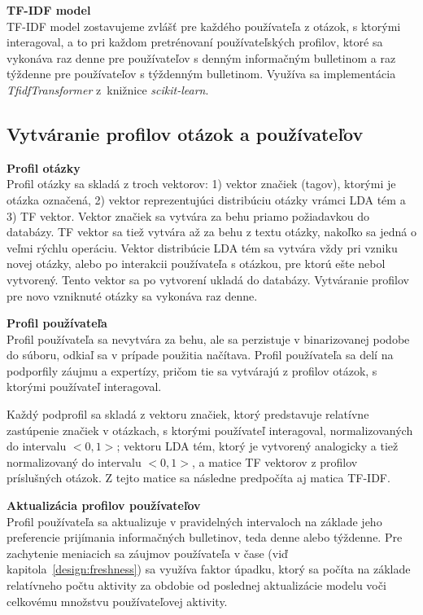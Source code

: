 \textbf{TF-IDF model}\\
TF-IDF model zostavujeme zvlášť pre každého používateľa z otázok, s ktorými interagoval, a to pri každom pretrénovaní používateľských
profilov, ktoré sa vykonáva raz denne pre používateľov s denným informačným bulletinom a raz týždenne pre používateľov s týždenným
bulletinom. Využíva sa implementácia \textit{TfidfTransformer} z~knižnice \textit{scikit-learn}.


\subsection{Vytváranie profilov otázok a používateľov}

\textbf{Profil otázky}\\
Profil otázky sa skladá z troch vektorov: 1) vektor značiek (tagov), ktorými je otázka označená, 2) vektor reprezentujúci
distribúciu otázky vrámci LDA tém a 3) TF vektor. Vektor značiek sa vytvára za behu priamo požiadavkou do databázy. TF vektor
sa tiež vytvára až za behu z textu otázky, nakoľko sa jedná o veľmi rýchlu operáciu. Vektor distribúcie LDA tém sa vytvára
vždy pri vzniku novej otázky, alebo po interakcii používateľa s otázkou, pre ktorú ešte nebol vytvorený. Tento vektor
sa po vytvorení ukladá do databázy. Vytváranie profilov pre novo vzniknuté otázky sa vykonáva raz denne.

\textbf{Profil používateľa}\\
Profil používateľa sa nevytvára za behu, ale sa perzistuje v binarizovanej podobe do súboru, odkiaľ sa v prípade použitia
načítava. Profil používateľa sa delí na podporfily záujmu a expertízy, pričom tie sa vytvárajú z profilov otázok, s ktorými
používateľ interagoval.

Každý podprofil sa skladá z vektoru značiek, ktorý predstavuje relatívne zastúpenie značiek v otázkach, s ktorými používateľ interagoval,
normalizovaných do intervalu $<0,1>$; vektoru LDA tém, ktorý je vytvorený analogicky a tiež normalizovaný do intervalu $<0,1>$,
a matice TF vektorov z profilov príslušných otázok. Z tejto matice sa následne predpočíta aj matica TF-IDF.

\textbf{Aktualizácia profilov používateľov}\\
Profil používateľa sa aktualizuje v pravidelných intervaloch na základe jeho preferencie prijímania informačných bulletinov, teda
denne alebo týždenne. Pre zachytenie meniacich sa záujmov používateľa v čase (viď kapitola~\ref{design:freshness}) sa využíva
faktor úpadku, ktorý sa počíta na základe relatívneho počtu aktivity za obdobie od poslednej aktualizácie modelu voči
celkovému množstvu používateľovej aktivity.

